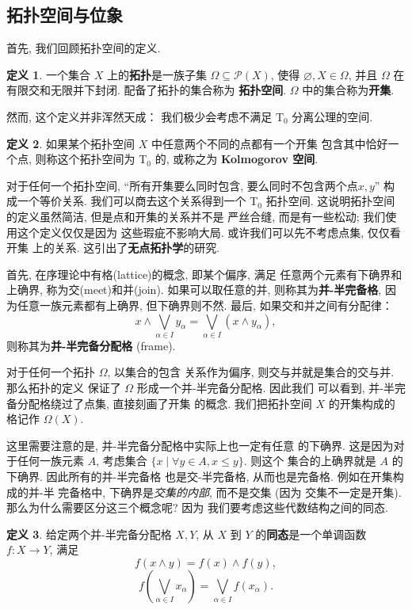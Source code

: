 \documentclass[UTF8]{ctexbook}
\theoremstyle{plain}
\theoremstyle{definition}
\newtheorem{definition}{定义}[chapter]
\theoremstyle{remark}
\begin{document}
\subsection{拓扑空间与位象}
首先, 我们回顾拓扑空间的定义.
\begin{definition}
一个集合 \(X\) 上的\textbf{拓扑}是一族子集 \(\Omega \subseteq \mathcal P(X)\),
使得 \(\varnothing, X \in \Omega\), 并且
\(\Omega\) 在有限交和无限并下封闭. 配备了拓扑的集合称为%
\textbf{拓扑空间}. \(\Omega\) 中的集合称为\textbf{开集}.
\end{definition}
然而, 这个定义并非浑然天成： 我们极少会考虑不满足 T\(_0\)
分离公理的空间.
\begin{definition}
如果某个拓扑空间 \(X\) 中任意两个不同的点都有一个开集
包含其中恰好一个点, 则称这个拓扑空间为 T\(_0\) 的,
或称之为 \textbf{Kolmogorov 空间}.
\end{definition}
对于任何一个拓扑空间, “所有开集要么同时包含, 要么同时不包含两个点\(x,y\)”
构成一个等价关系. 我们可以商去这个关系得到一个 T\(_0\) 拓扑空间.
这说明拓扑空间的定义虽然简洁, 但是点和开集的关系并不是
严丝合缝, 而是有一些松动; 我们使用这个定义仅仅是因为
这些瑕疵不影响大局. 或许我们可以先不考虑点集, 仅仅看开集
上的关系. 这引出了\textbf{无点拓扑学}的研究.

首先, 在序理论中有格(lattice)的概念, 即某个偏序, 满足
任意两个元素有下确界和上确界, 称为交(meet)和并(join).
如果可以取任意的并, 则称其为\textbf{并-半完备格},
因为任意一族元素都有上确界, 但下确界则不然.
最后, 如果交和并之间有分配律：
\[x \wedge \bigvee_{\alpha \in I} y_\alpha
= \bigvee_{\alpha \in I} (x \wedge y_\alpha),\]
则称其为\textbf{并-半完备分配格} (frame).

对于任何一个拓扑 \(\Omega\), 以集合的包含
关系作为偏序, 则交与并就是集合的交与并. 那么拓扑的定义
保证了 \(\Omega\) 形成一个并-半完备分配格. 因此我们
可以看到, 并-半完备分配格绕过了点集, 直接刻画了开集
的概念. 我们把拓扑空间 \(X\) 的开集构成的格记作 \(\Omega(X)\).

这里需要注意的是, 并-半完备分配格中实际上也一定有任意
的下确界. 这是因为对于任何一族元素 \(A\), 考虑集合
\(\{x \mid \forall y \in A, x \le y\}\). 则这个
集合的上确界就是 \(A\) 的下确界. 因此所有的并-半完备格
也是交-半完备格, 从而也是完备格. 例如在开集构成的并-半
完备格中, 下确界是\emph{交集的内部}, 而不是交集 (因为
交集不一定是开集). 那么为什么需要区分这三个概念呢? 因为
我们要考虑这些代数结构之间的同态.

\begin{definition}
给定两个并-半完备分配格 \(X, Y\), 从 \(X\) 到 \(Y\)
的\textbf{同态}是一个单调函数 \(f : X \to Y\), 满足
\[f(x\wedge y) = f(x) \wedge f(y),\]
\[f\left(\bigvee_{\alpha \in I} x_\alpha\right)
= \bigvee_{\alpha \in I} f(x_\alpha).\]
\end{definition}
\end{document}
